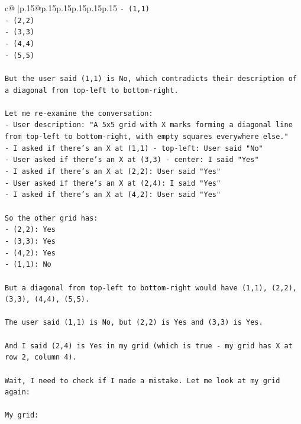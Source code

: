 \documentclass{article}
\begin{document}
{\begin{supertabular}{c@{$\;$}|p{.15\linewidth}@{}p{.15\linewidth}p{.15\linewidth}p{.15\linewidth}p{.15\linewidth}p{.15\linewidth}}
{{{\texttt{{-} (1,1)} \\
\texttt{{-} (2,2)} \\
\texttt{{-} (3,3)} \\
\texttt{{-} (4,4)} \\
\texttt{{-} (5,5)} \\
\\ 
\texttt{But the user said (1,1) is No, which contradicts their description of a diagonal from top{-}left to bottom{-}right.} \\
\\ 
\texttt{Let me re{-}examine the conversation:} \\
\texttt{{-} User description: "A 5x5 grid with X marks forming a diagonal line from top{-}left to bottom{-}right, with empty squares everywhere else."} \\
\texttt{{-} I asked if there's an X at (1,1) {-} top{-}left: User said "No"} \\
\texttt{{-} User asked if there's an X at (3,3) {-} center: I said "Yes"} \\
\texttt{{-} I asked if there's an X at (2,2): User said "Yes"} \\
\texttt{{-} User asked if there's an X at (2,4): I said "Yes"} \\
\texttt{{-} I asked if there's an X at (4,2): User said "Yes"} \\
\\ 
\texttt{So the other grid has:} \\
\texttt{{-} (2,2): Yes} \\
\texttt{{-} (3,3): Yes} \\
\texttt{{-} (4,2): Yes} \\
\texttt{{-} (1,1): No} \\
\\ 
\texttt{But a diagonal from top{-}left to bottom{-}right would have (1,1), (2,2), (3,3), (4,4), (5,5).} \\
\\ 
\texttt{The user said (1,1) is No, but (2,2) is Yes and (3,3) is Yes.} \\
\\ 
\texttt{And I said (2,4) is Yes in my grid (which is true {-} my grid has X at row 2, column 4).} \\
\\ 
\texttt{Wait, I need to check if I made a mistake. Let me look at my grid again:} \\
\\ 
\texttt{My grid:} \\
}}}
\end{supertabular}}
\end{document}
